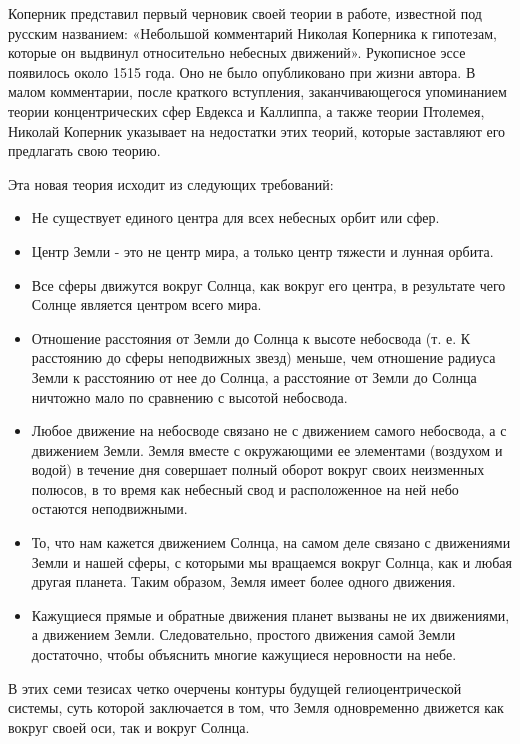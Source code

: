 \documentclass[
]{article}
\providecommand{\tightlist}{%
  \setlength{\itemsep}{0pt}\setlength{\parskip}{0pt}}
\begin{document}
Коперник представил первый черновик своей теории в работе, известной под
русским названием: «Небольшой комментарий Николая Коперника к гипотезам,
которые он выдвинул относительно небесных движений». Рукописное эссе
появилось около 1515 года. Оно не было опубликовано при жизни автора. В
малом комментарии, после краткого вступления, заканчивающегося
упоминанием теории концентрических сфер Евдекса и Каллиппа, а также
теории Птолемея, Николай Коперник указывает на недостатки этих теорий,
которые заставляют его предлагать свою теорию.

Эта новая теория исходит из следующих требований:

\begin{itemize}
\tightlist
\item
  Не существует единого центра для всех небесных орбит или сфер.
\item
  Центр Земли - это не центр мира, а только центр тяжести и лунная
  орбита.
\item
  Все сферы движутся вокруг Солнца, как вокруг его центра, в результате
  чего Солнце является центром всего мира.
\item
  Отношение расстояния от Земли до Солнца к высоте небосвода (т. е. К
  расстоянию до сферы неподвижных звезд) меньше, чем отношение радиуса
  Земли к расстоянию от нее до Солнца, а расстояние от Земли до Солнца
  ничтожно мало по сравнению с высотой небосвода.
\item
  Любое движение на небосводе связано не с движением самого небосвода, а
  с движением Земли. Земля вместе с окружающими ее элементами (воздухом
  и водой) в течение дня совершает полный оборот вокруг своих неизменных
  полюсов, в то время как небесный свод и расположенное на ней небо
  остаются неподвижными.
\item
  То, что нам кажется движением Солнца, на самом деле связано с
  движениями Земли и нашей сферы, с которыми мы вращаемся вокруг Солнца,
  как и любая другая планета. Таким образом, Земля имеет более одного
  движения.
\item
  Кажущиеся прямые и обратные движения планет вызваны не их движениями,
  а движением Земли. Следовательно, простого движения самой Земли
  достаточно, чтобы объяснить многие кажущиеся неровности на небе.
\end{itemize}

В этих семи тезисах четко очерчены контуры будущей гелиоцентрической
системы, суть которой заключается в том, что Земля одновременно движется
как вокруг своей оси, так и вокруг Солнца.
\end{document}
